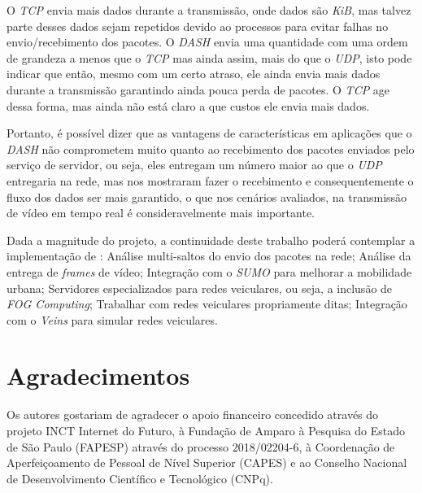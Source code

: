 \documentclass[12pt]{article}
\begin{document}
    O \textit{TCP} envia mais dados durante a transmissão, onde dados são \textit{KiB}, mas talvez parte desses dados sejam repetidos devido ao processos para evitar falhas no envio/recebimento dos pacotes. O \textit{DASH} envia uma quantidade com uma ordem de grandeza a menos que o \textit{TCP} mas ainda assim, mais do que o \textit{UDP}, isto pode indicar que então, mesmo com um certo atraso, ele ainda envia mais dados durante a transmissão garantindo ainda pouca perda de pacotes. O \textit{TCP} age dessa forma, mas ainda não está claro a que custos ele envia mais dados.
    
	Portanto, é possível dizer que as vantagens de características em aplicações que o \textit{DASH} não comprometem muito quanto ao recebimento dos pacotes enviados pelo serviço de servidor, ou seja, eles entregam um número maior ao que o \textit{UDP} entregaria na rede, mas nos mostraram fazer o recebimento e consequentemente o fluxo dos dados ser mais garantido, o que nos cenários avaliados, na transmissão de vídeo em tempo real é consideravelmente mais importante.

	Dada a magnitude do projeto, a continuidade deste trabalho poderá contemplar a implementação de : Análise multi-saltos do envio dos pacotes na rede; Análise da entrega de \textit{frames} de vídeo; Integração com o \textit{SUMO} para melhorar a mobilidade urbana; Servidores especializados para redes veiculares, ou seja, a inclusão de \textit{FOG Computing}; Trabalhar com redes veiculares propriamente ditas; Integração com o \textit{Veins} para simular redes veiculares.
		
\section*{Agradecimentos}
	Os autores gostariam de agradecer o apoio financeiro concedido através do projeto INCT Internet do Futuro, à Fundação de Amparo à Pesquisa do Estado de São Paulo (FAPESP) através do processo 2018/02204-6, à Coordenação de Aperfeiçoamento de Pessoal de Nível Superior (CAPES) e ao Conselho Nacional de Desenvolvimento Científico e Tecnológico (CNPq).

%
%

\end{document}

